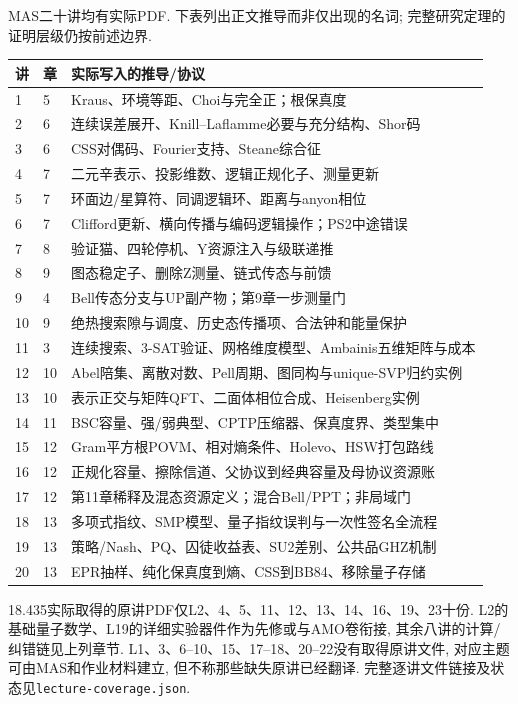 MAS二十讲均有实际PDF. 下表列出正文推导而非仅出现的名词; 完整研究定理的证明层级仍按前述边界.
\begin{longtable}{p{.09\linewidth}p{.12\linewidth}p{.69\linewidth}}
\toprule 讲 & 章 & 实际写入的推导/协议\\\midrule\endhead
1 & 5 & Kraus、环境等距、Choi与完全正；根保真度\\
2 & 6 & 连续误差展开、Knill--Laflamme必要与充分结构、Shor码\\
3 & 6 & CSS对偶码、Fourier支持、Steane综合征\\
4 & 7 & 二元辛表示、投影维数、逻辑正规化子、测量更新\\
5 & 7 & 环面边/星算符、同调逻辑环、距离与anyon相位\\
6 & 7 & Clifford更新、横向传播与编码逻辑操作；PS2中途错误\\
7 & 8 & 验证猫、四轮停机、Y资源注入与级联递推\\
8 & 9 & 图态稳定子、删除Z测量、链式传态与前馈\\
9 & 4 & Bell传态分支与UP副产物；第9章一步测量门\\
10 & 9 & 绝热搜索隙与调度、历史态传播项、合法钟和能量保护\\
11 & 3 & 连续搜索、3-SAT验证、网格维度模型、Ambainis五维矩阵与成本\\
12 & 10 & Abel陪集、离散对数、Pell周期、图同构与unique-SVP归约实例\\
13 & 10 & 表示正交与矩阵QFT、二面体相位合成、Heisenberg实例\\
14 & 11 & BSC容量、强/弱典型、CPTP压缩器、保真度界、类型集中\\
15 & 12 & Gram平方根POVM、相对熵条件、Holevo、HSW打包路线\\
16 & 12 & 正规化容量、擦除信道、父协议到经典容量及母协议资源账\\
17 & 12 & 第11章稀释及混态资源定义；混合Bell/PPT；非局域门\\
18 & 13 & 多项式指纹、SMP模型、量子指纹误判与一次性签名全流程\\
19 & 13 & 策略/Nash、PQ、囚徒收益表、SU2差别、公共品GHZ机制\\
20 & 13 & EPR抽样、纯化保真度到熵、CSS到BB84、移除量子存储\\
\bottomrule\end{longtable}
18.435实际取得的原讲PDF仅L2、4、5、11、12、13、14、16、19、23十份. L2的基础量子数学、L19的详细实验器件作为先修或与AMO卷衔接, 其余八讲的计算/纠错链见上列章节. L1、3、6--10、15、17--18、20--22没有取得原讲文件, 对应主题可由MAS和作业材料建立, 但不称那些缺失原讲已经翻译. 完整逐讲文件链接及状态见\texttt{lecture-coverage.json}.
